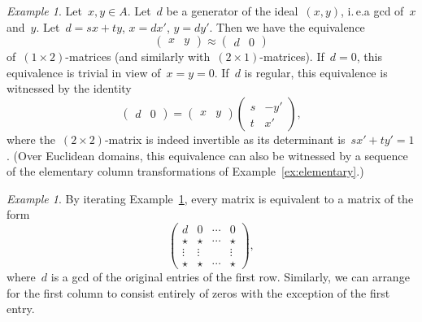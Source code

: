 \documentclass[12pt]{scrartcl}
\theoremstyle{definition}
\theoremstyle{plain}
\theoremstyle{remark}
\newtheorem{example}[definition]{Example}
\begin{document}
\begin{example}\label{ex:row-gcd}
    Let~$x,y \in A$. Let~$d$ be a generator of the ideal~$(x,y)$, i.\,e.\@ a gcd of~$x$ and~$y$. Let~$d = sx+ty$, $x=dx'$, $y = dy'$. Then we have the equivalence
    \[ \begin{pmatrix}x&y\end{pmatrix} \approx\begin{pmatrix}d&0\end{pmatrix}\]
    of~$(1 \times 2)$-matrices (and similarly with~$(2 \times 1)$-matrices).
    If~$d = 0$, this equivalence is trivial in view of~$x = y = 0$. If~$d$ is regular, this equivalence is witnessed by the identity
    \[ \begin{pmatrix}d&0\end{pmatrix} =
    \begin{pmatrix}x&y\end{pmatrix} \begin{pmatrix}s&-y'\\t&x'\end{pmatrix}\!, \]
    where the~$(2 \times 2)$-matrix is indeed invertible as its determinant is~$sx' + ty' = 1$. (Over Euclidean domains, this equivalence can also be witnessed by a sequence of the elementary column transformations of Example~\ref{ex:elementary}.) 
\end{example}

\begin{example}\label{ex:row-zero}
    By iterating Example~\ref{ex:row-gcd}, every matrix is equivalent to a matrix of the form
    \[ \begin{pmatrix}d&0&\cdots&0\\\star&\star&\cdots&\star\\\vdots&\vdots&&\vdots\\\star&\star&\cdots&\star\end{pmatrix}\!, \]
    where~$d$ is a gcd of the original entries of the first row. Similarly, we can arrange for the first column to consist entirely of zeros with the exception of the first entry.
\end{example}
\end{document}

